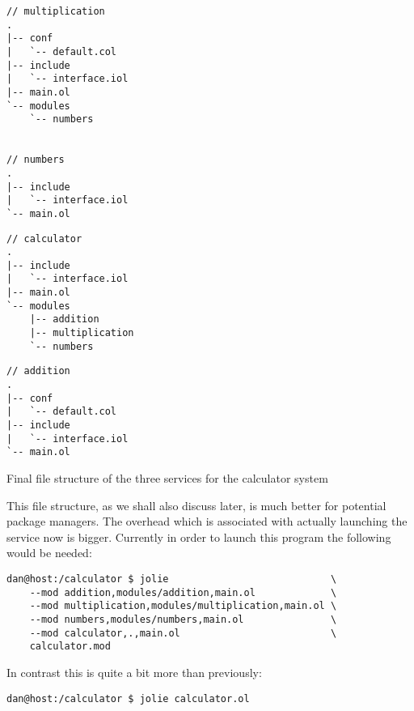 \begin{listing}[H]

\begin{multicols}{3}

\begin{verbatim}
// multiplication
.
|-- conf
|   `-- default.col
|-- include
|   `-- interface.iol
|-- main.ol
`-- modules
    `-- numbers


// numbers
.
|-- include
|   `-- interface.iol
`-- main.ol
\end{verbatim}

\columnbreak

\begin{verbatim}
// calculator
.
|-- include
|   `-- interface.iol
|-- main.ol
`-- modules
    |-- addition
    |-- multiplication
    `-- numbers
\end{verbatim}

\columnbreak

\begin{verbatim}
// addition
.
|-- conf
|   `-- default.col
|-- include
|   `-- interface.iol
`-- main.ol
\end{verbatim}

\end{multicols}

\caption{Final file structure of the three services for the calculator system}
\label{lst:final_file_structure}
\end{listing}

This file structure, as we shall also discuss later, is much better for
potential package managers. The overhead which is associated with actually
launching the service now is bigger. Currently in order to launch this program
the following would be needed:

\begin{verbatim}
dan@host:/calculator $ jolie                            \
    --mod addition,modules/addition,main.ol             \
    --mod multiplication,modules/multiplication,main.ol \
    --mod numbers,modules/numbers,main.ol               \
    --mod calculator,.,main.ol                          \
    calculator.mod
\end{verbatim}

In contrast this is quite a bit more than previously:

\begin{verbatim}
dan@host:/calculator $ jolie calculator.ol
\end{verbatim}

